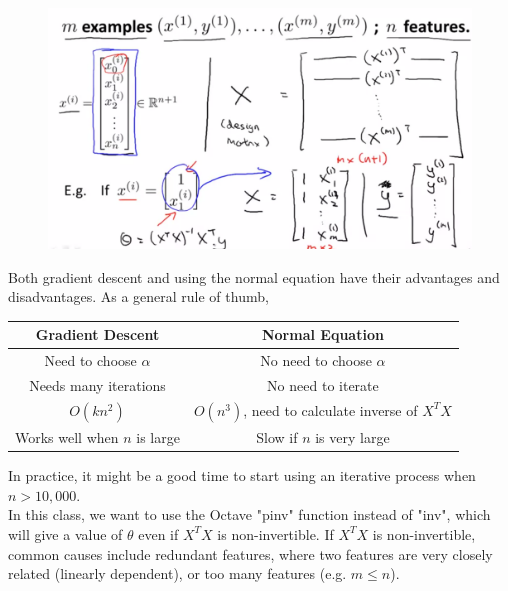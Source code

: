 \documentclass{article}
\begin{document}
        \begin{figure}[hbt!]
            \centering
            \includegraphics[scale=0.4]{Resources/Norm_Equation_Example3}
        \end{figure}

        \noindent Both gradient descent and using the normal equation have their advantages and disadvantages.
        As a general rule of thumb,

        \begin{center}
            \begin{tabular}{|c|c|}
                \hline
                \textbf{Gradient Descent}       & \textbf{Normal Equation} \\
                \hline
                Need to choose $\alpha$         & No need to choose $\alpha$ \\
                \hline
                Needs many iterations           & No need to iterate \\
                \hline
                $O(kn^2)$                       & $O(n^3)$, need to calculate inverse of $X^T X$ \\
                \hline
                Works well when $n$ is large    & Slow if $n$ is very large \\
                \hline
            \end{tabular}
        \end{center}

        \noindent In practice, it might be a good time to start using an iterative process when $n>10,000$. \\

        \noindent In this class, we want to use the Octave "pinv" function instead of "inv", which will give
        a value of $\theta$ even if $X^T X$ is non-invertible. If $X^T X$ is non-invertible, common causes
        include redundant features, where two features are very closely related (linearly dependent), or
        too many features (e.g. $m\leq n$).
\end{document}
